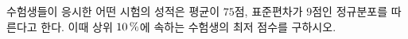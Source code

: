 수험생들이 응시한 어떤 시험의 성적은 평균이 $75$점, 표준편차가 $9$점인 정규분포를 따른다고 한다. 이때 상위 $10\mkern3mu \%$에 속하는 수험생의 최저 점수를 구하시오. 
